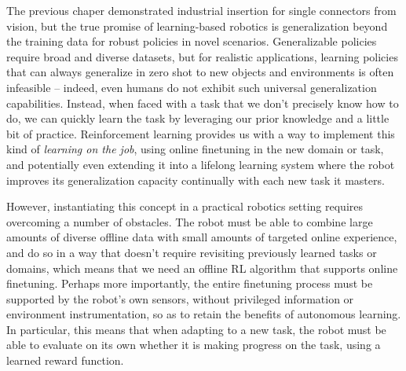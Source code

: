 The previous chaper demonstrated industrial insertion for single connectors from vision, but the true promise of learning-based robotics is generalization beyond the training data for robust policies in novel scenarios.
Generalizable policies require broad and diverse datasets, but for realistic applications, learning policies that can always generalize in zero shot to new objects and environments is often infeasible -- indeed, even humans do not exhibit such universal generalization capabilities. Instead, when faced with a task that we don't precisely know how to do, we can quickly learn the task by leveraging our prior knowledge and a little bit of practice. Reinforcement learning provides us with a way to implement this kind of \textit{learning on the job}, using online finetuning in the new domain or task, and potentially even extending it into a lifelong learning system where the robot improves its generalization capacity continually with each new task it masters.

However, instantiating this concept in a practical robotics setting requires overcoming a number of obstacles. The robot must be able to combine large amounts of diverse offline data with small amounts of targeted online experience, and do so in a way that doesn't require revisiting previously learned tasks or domains, which means that we need an offline RL algorithm that supports online finetuning. Perhaps more importantly, the entire finetuning process must be supported by the robot's own sensors, without privileged information or environment instrumentation, so as to retain the benefits of autonomous learning. In particular, this means that when adapting to a new task, the robot must be able to evaluate on its own whether it is making progress on the task, using a learned reward function.

